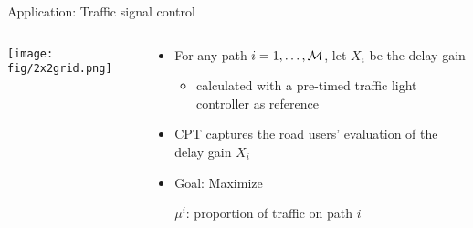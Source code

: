 \documentclass{beamer}
\begin{document}
\begin{frame}{Application: Traffic signal control}
\begin{columns}
	\begin{column}{0.38\textwidth}
	        \texttt{[image: fig/2x2grid.png]}
	\end{column}
	\begin{column}{0.57\textwidth}
	\begin{small}
	\begin{itemize}
		\item For any path $i=1,\ldots,{\mathcal{M}}$, let $X_i$ be the delay gain
		\begin{itemize}
			\item {\scriptsize calculated with a pre-timed traffic light controller as reference}
		\end{itemize} 
		\item CPT captures the road users' evaluation of the delay gain $X_i$
		\item Goal: Maximize 
				
				$\mu^i$: proportion of traffic on path $i$
	\end{itemize}
	\end{small}
	\end{column}
\end{columns}

\end{frame}
\end{document}
